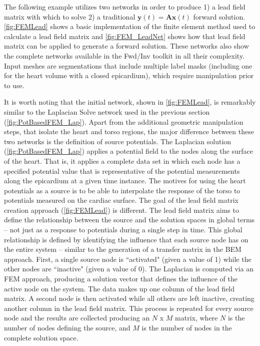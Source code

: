 The following example utilizes two networks in order to produce 1) a lead field matrix with which to solve
2) a traditional $\mathbf{y}(t) = \mathbf{A}\mathbf{x}(t)$ forward solution.
\autoref{fig:FEMLead} shows a basic implementation of the finite element method used to calculate a lead field matrix and \autoref{fig:FEM_LeadNet} shows how that lead field matrix can be applied to generate a forward solution.
These networks also show the complete networks available in the Fwd/Inv toolkit in all their complexity.
Input meshes are segmentations that include multiple label masks (including one for the heart volume with a closed epicardium), which require manipulation prior to use.

It is worth noting that the initial network, shown in \autoref{fig:FEMLead}, is remarkably similar to the Laplacian Solve network used in the previous section (\autoref{fig:PotBasedFEM_Lap}).
Apart from the additional geometric manipulation steps, that isolate the heart and torso regions, the major difference between these two networks is the definition of source potentials.
The Laplacian solution (\autoref{fig:PotBasedFEM_Lap}) applies a potential field to the nodes along the surface of the heart.
That is, it applies a complete data set in which each node has a specified potential value that is representative of the potential measurements along the epicardium at a given time instance.
The motives for using the heart potentials as a source is to be able to interpolate the response of the torso to potentials measured on the cardiac surface.
The goal of the lead field matrix creation approach (\autoref{fig:FEMLead}) is different.
The lead field matrix aims to define the relationship between the source and the solution spaces in global terms -- not just as a response to potentials during a single step in time.
This global relationship is defined by identifying the influence that each source node has on the entire system -- similar to the generation of a transfer matrix in the BEM approach.
First, a single source node is ``activated" (given a value of 1) while the other nodes are ``inactive" (given a value of 0).
The Laplacian is computed via an FEM approach, producing a solution vector that defines the influence of the active node on the system.
The data makes up one column of the lead field matrix.
A second node is then activated while all others are left inactive, creating another column in the lead field matrix.
This process is repeated for every source node and the results are collected producing an $N$ x $M$ matrix, where $N$ is the number of nodes defining the source, and $M$ is the number of nodes in the complete solution space.

